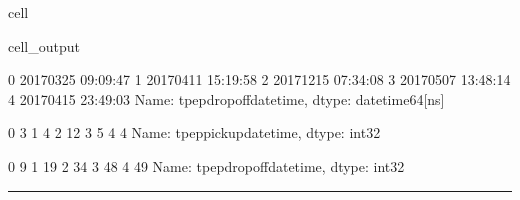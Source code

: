 \documentclass[letterpaper,10pt,english]{sphinxmanual}
\begin{document}
\begin{sphinxuseclass}{cell}
\begin{sphinxuseclass}{cell_output}
\begin{sphinxVerbatim}[commandchars=\\\{\}]
0   2017\PYGZhy{}03\PYGZhy{}25 09:09:47
1   2017\PYGZhy{}04\PYGZhy{}11 15:19:58
2   2017\PYGZhy{}12\PYGZhy{}15 07:34:08
3   2017\PYGZhy{}05\PYGZhy{}07 13:48:14
4   2017\PYGZhy{}04\PYGZhy{}15 23:49:03
Name: tpep\PYGZus{}dropoff\PYGZus{}datetime, dtype: datetime64[ns]

\PYGZus{}\PYGZus{}\PYGZus{}\PYGZus{}\PYGZus{}\PYGZus{}\PYGZus{}\PYGZus{}\PYGZus{}\PYGZus{}\PYGZus{}\PYGZus{}\PYGZus{}\PYGZus{}\PYGZus{}\PYGZus{}\PYGZus{}\PYGZus{}\PYGZus{}\PYGZus{}\PYGZus{}\PYGZus{}\PYGZus{}\PYGZus{}\PYGZus{}\PYGZus{}\PYGZus{}\PYGZus{}\PYGZus{}\PYGZus{}\PYGZus{}\PYGZus{}\PYGZus{}\PYGZus{}\PYGZus{}\PYGZus{}\PYGZus{}\PYGZus{}\PYGZus{}\PYGZus{}\PYGZus{}\PYGZus{}\PYGZus{}\PYGZus{}\PYGZus{}\PYGZus{}\PYGZus{}\PYGZus{}\PYGZus{}\PYGZus{}

0     3
1     4
2    12
3     5
4     4
Name: tpep\PYGZus{}pickup\PYGZus{}datetime, dtype: int32

\PYGZus{}\PYGZus{}\PYGZus{}\PYGZus{}\PYGZus{}\PYGZus{}\PYGZus{}\PYGZus{}\PYGZus{}\PYGZus{}\PYGZus{}\PYGZus{}\PYGZus{}\PYGZus{}\PYGZus{}\PYGZus{}\PYGZus{}\PYGZus{}\PYGZus{}\PYGZus{}\PYGZus{}\PYGZus{}\PYGZus{}\PYGZus{}\PYGZus{}\PYGZus{}\PYGZus{}\PYGZus{}\PYGZus{}\PYGZus{}\PYGZus{}\PYGZus{}\PYGZus{}\PYGZus{}\PYGZus{}\PYGZus{}\PYGZus{}\PYGZus{}\PYGZus{}\PYGZus{}\PYGZus{}\PYGZus{}\PYGZus{}\PYGZus{}\PYGZus{}\PYGZus{}\PYGZus{}\PYGZus{}\PYGZus{}\PYGZus{}

0     9
1    19
2    34
3    48
4    49
Name: tpep\PYGZus{}dropoff\PYGZus{}datetime, dtype: int32
\end{sphinxVerbatim}

\end{sphinxuseclass}
\end{sphinxuseclass}

\bigskip\hrule\bigskip


\sphinxAtStartPar
{}
\end{document}
